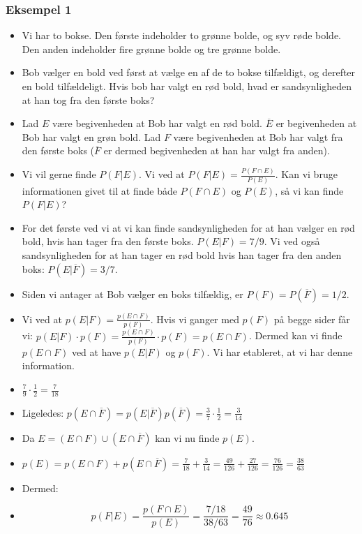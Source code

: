 \documentclass{beamer}
\begin{document}
\begin{frame}[allowframebreaks]
  \frametitle{Eksempel 1}

  \begin{itemize}
  \item Vi har to bokse. Den første indeholder to grønne bolde, og syv røde bolde. Den anden indeholder fire grønne bolde og tre grønne bolde.
  \item Bob vælger en bold ved først at vælge en af de to bokse tilfældigt, og derefter en bold tilfældeligt. Hvis bob har valgt en rød bold, hvad er sandsynligheden at han tog fra den første boks? 
  \item Lad $E$ være begivenheden at Bob har valgt en rød bold. $\overline{E}$ er begivenheden at Bob har valgt en grøn bold. Lad $F$ være begivenheden at Bob har valgt fra den første boks ($\overline{F}$ er dermed begivenheden at han har valgt fra anden).
  \item Vi vil gerne finde $P(F|E)$. Vi ved at $P(F|E) = \frac{P(F \cap E)}{P(E)}$. Kan vi bruge informationen givet til at finde både $P(F \cap E)$ og $P(E)$, så vi kan finde $P(F|E)$?
  \item For det første ved vi at vi kan finde sandsynligheden for at han vælger en rød bold, hvis han tager fra den første boks. $P(E|F) = 7/9$. Vi ved også sandsynligheden for at han tager en rød bold hvis han tager fra den anden boks: $P(E|\overline{F}) = 3/7$. 
  \item Siden vi antager at Bob vælger en boks tilfældig, er $P(F) = P(\overline{F}) = 1/2$.
  \item Vi ved at $p(E|F) = \frac{p(E \cap F)}{p(F)}$. Hvis vi ganger med $p(F)$ på begge sider får vi: $p(E|F) \cdot p(F) = \frac{p(E \cap F)}{p(F)} \cdot p(F) = p(E \cap F)$. Dermed kan vi finde $p(E \cap F)$ ved at have $p(E|F)$ og $p(F)$. Vi har etableret, at vi har denne information.
  \item $\frac{7}{9}\cdot \frac{1}{2} = \frac{7}{18}$
  \item Ligeledes: $p(E \cap \overline{F}) = p(E| \overline{F}) p(\overline{F}) = \frac{3}{7} \cdot \frac{1}{2} = \frac{3}{14}$
  \item Da $E = (E \cap F) \cup (E \cap \overline{F})$ kan vi nu finde $p(E)$.
  \item $p(E) = p(E \cap F) + p(E \cap \overline{F}) = \frac{7}{18} + \frac{3}{14} = \frac{49}{126} + \frac{27}{126} = \frac{76}{126} = \frac{38}{63}$
  \item Dermed:
  \item \[ p(F|E) = \frac{p(F \cap E)}{p(E)} = \frac{7/18}{38/63} = \frac{49}{76} \approx 0.645 \]
  \end{itemize}
\end{frame}
\end{document}
